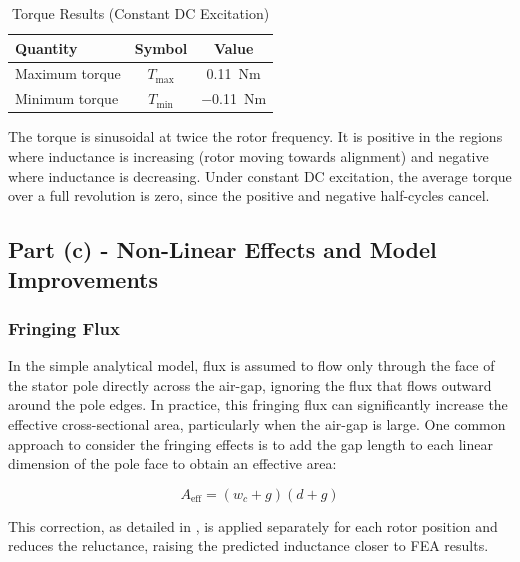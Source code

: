 \documentclass[12pt, a4paper]{article}
\begin{document}
\begin{table}[htbp]
    \centering
    \caption{Torque Results (Constant DC Excitation)}
    \label{tab:results_b}
    \begin{tabular}{lcc}
        \toprule
        \textbf{Quantity} & \textbf{Symbol} & \textbf{Value} \\
        \midrule
        Maximum torque  & $T_{\max}$  & \SI{+0.11}{Nm} \\
        Minimum torque  & $T_{\min}$  & \SI{-0.11}{Nm} \\
        \bottomrule
    \end{tabular}
\end{table}

The torque is sinusoidal at twice the rotor frequency. It is positive in the regions where inductance is increasing (rotor moving towards alignment) and negative where inductance is decreasing. Under constant DC excitation, the average torque over a full revolution is zero, since the positive and negative half-cycles cancel.









\subsection{Part (c) - Non-Linear Effects and Model Improvements}

\subsubsection{Fringing Flux}

In the simple analytical model, flux is assumed to flow only through the face of the stator pole directly across the air-gap, ignoring the flux that flows outward around the pole edges. In practice, this fringing flux can significantly increase the effective cross-sectional area, particularly when the air-gap is large. One common approach to consider the fringing effects is to add the gap length to each linear dimension of the pole face to obtain an effective area:

\begin{equation}
    A_\text{eff} = (w_c + g)(d + g)
\end{equation}

This correction, as detailed in \cite{hurley2013}, is applied separately for each rotor position and reduces the reluctance, raising the predicted inductance closer to FEA results.
\end{document}
